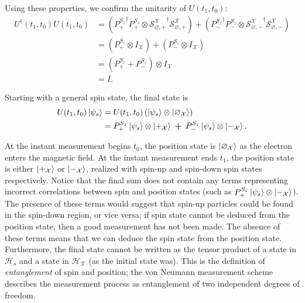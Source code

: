 Using these properties, we confirm the unitarity of $U(t_1, t_0)$:
\begin{align}
  U^\dagger(t_1, t_0) U(t_1, t_0) &=  \left({P^{S_z}_+}^\dagger {P^{S_z}_+} \otimes {\mathcal{S}^{\mathcal{X}}_{\varnothing, +}}^\dagger \mathcal{S}^{\mathcal{X}}_{\varnothing, +} \right) + \left({P^{S_z}_-}^\dagger P^{S_z}_- \otimes {\mathcal{S}^{\mathcal{X}}_{\varnothing, -}}^\dagger {\mathcal{S}^{\mathcal{X}}_{\varnothing, -}}\right) \\ \nonumber
  &= \left({P^{S_z}_+} \otimes I_\mathcal{X}\right) + \left({P^{S_z}_-} \otimes I_\mathcal{X}\right) \\ \nonumber
  &= \left( {P^{S_z}_+} + {P^{S_z}_-} \right) \otimes I_\mathcal{X} \\ \nonumber
  &= I.
\end{align}

Starting with a general spin state, the final state is
\begin{align} \label{eq: Experiment 1 final state}
  U(t_1, t_0)\ket{\psi_s} & =  U(t_1, t_0) \left(\ket{\psi_s} \otimes \ket{\varnothing_\mathcal{X}} \right) \\
  &= \nonumber P^{S_z}_+ \ket{\psi_s} \otimes \ket{+_{\mathcal{X}}} \: \bm{+} \: P^{S_z}_- \ket{\psi_s} \otimes \ket{-_{\mathcal{X}}}.
\end{align}

At the instant measurement begins $t_0$, the position state is $\ket{\varnothing_\mathcal{X}}$ as the electron enters the magnetic field. At the instant measurement ends $t_1$, the position state is either $\ket{+_{\mathcal{X}}}$ or $\ket{-_{\mathcal{X}}}$, realized with spin-up and spin-down spin states respectively. Notice that the final sum does not contain any terms representing incorrect correlations between spin and position states (such as $ P^{S_z}_+ \ket{\psi_s} \otimes \ket{-_{\mathcal{X}}}$). The presence of these terms would suggest that spin-up particles could be found in the spin-down region, or vice versa; if spin state cannot be deduced from the position state, then a good measurement has not been made. The absence of these terms means that we can deduce the spin state from the position state. Furthermore, the final state cannot be written as the tensor product of a state in $\mathcal{H}_s$ and a state in $\mathcal{H}_\mathcal{X}$ (as the initial state was). This is the definition of \textit{entanglement} of spin and position; the von Neumann measurement scheme describes the measurement process as entanglement of two independent degrees of freedom.

